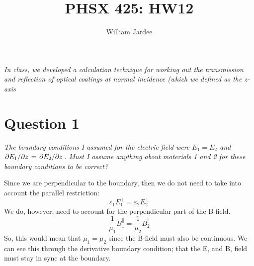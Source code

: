 \documentclass[12pt]{article}
\begin{document}
\title{PHSX 425: HW12}
\author{William Jardee}
\maketitle

\noindent
\emph{In class, we developed a calculation technique for working out the transmission and reflection of optical coatings at normal incidence (which we defined as the $z$-axis}
\section*{Question 1}
{\sl The boundary conditions I assumed for the electric field were $E_1 = E_2$ and $\pdv*{E_1}{z} = \pdv*{E_2}{z}$. Must I assume anything about materials 1 and 2 for these boundary conditions to be correct?}

Since we are perpendicular to the boundary, then we do not need to take into account the parallel restriction: 
\[\varepsilon_1 E^\perp_1 = \varepsilon_2 E^\perp_2\]
We do, however, need to account for the perpendicular part of the B-field.
\[\frac{1}{\mu_1}B^\parallel_1 = \frac{1}{\mu_2}B^\parallel_2\]
So, this would mean that $\mu_1 = \mu_2$ since the B-field must also be continuous. We can see this through the derivative boundary condition; that the E, and B, field must stay in sync at the boundary.

\newpage
\end{document}
